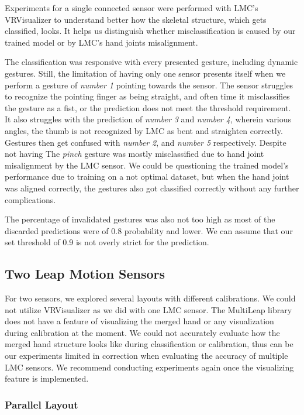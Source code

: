 Experiments for a single connected sensor were performed with LMC's VRVisualizer to understand better how the skeletal structure, which gets classified, looks. It helps us distinguish whether misclassification is caused by our trained model or by LMC's hand joints misalignment.

The classification was responsive with every presented gesture, including dynamic gestures. Still, the limitation of having only one sensor presents itself when we perform a gesture of \textit{number 1} pointing towards the sensor. The sensor struggles to recognize the pointing finger as being straight, and often time it misclassifies the gesture as a fist, or the prediction does not meet the threshold requirement. It also struggles with the prediction of \textit{number 3} and \textit{number 4}, wherein various angles, the thumb is not recognized by LMC as bent and straighten correctly. Gestures then get confused with \textit{number 2}, and \textit{number 5} respectively. Despite not having  The \textit{pinch} gesture was mostly misclassified due to hand joint misalignment by the LMC sensor. We could be questioning the trained model's performance due to training on a not optimal dataset, but when the hand joint was aligned correctly, the gestures also got classified correctly without any further complications.

The percentage of invalidated gestures was also not too high as most of the discarded predictions were of 0.8 probability and lower. We can assume that our set threshold of 0.9 is not overly strict for the prediction.

\subsection{Two Leap Motion Sensors}

For two sensors, we explored several layouts with different calibrations. We could not utilize VRVisualizer as we did with one LMC sensor. The MultiLeap library does not have a feature of visualizing the merged hand or any visualization during calibration at the moment. We could not accurately evaluate how the merged hand structure looks like during classification or calibration, thus can be our experiments limited in correction when evaluating the accuracy of multiple LMC sensors. We recommend conducting experiments again once the visualizing feature is implemented.

\subsubsection{Parallel Layout}
\label{parallel_layout}


